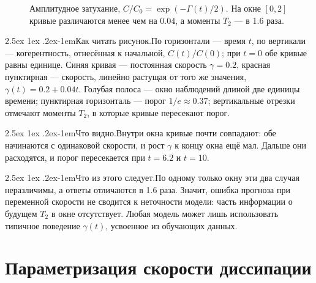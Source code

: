 \documentclass[12pt,a4paper]{report}
\makeatletter
\renewcommand\paragraph{\@startsection{paragraph}{4}{\z@}%
  {2.5ex \@plus1ex \@minus.2ex}{-1em}{\normalfont\normalsize\bfseries}}
\numberwithin{equation}{chapter}
\newcommand{\figread}{\paragraph{Как читать рисунок.}}
\newcommand{\figsee}{\paragraph{Что видно.}}
\newcommand{\figgen}{\paragraph{Что из этого следует.}}
\makeatother
\begin{document}
\begin{figure}[h]
\centering
{}
\caption{Амплитудное затухание, $C/C_0=\exp(-\Gamma(t)/2)$. На окне $[0,2]$
кривые различаются менее чем на $0.04$, а моменты $T_2$ --- в 1.6 раза.}
\label{fig:extrap}
\end{figure}

\figread По горизонтали --- время $t$, по вертикали --- когерентность,
отнесённая к начальной, $C(t)/C(0)$; при $t=0$ обе кривые равны единице.
Синяя кривая --- постоянная скорость $\gamma=0.2$, красная пунктирная ---
скорость, линейно растущая от того же значения, $\gamma(t)=0.2+0.04t$.
Голубая полоса --- окно наблюдений длиной две единицы времени; пунктирная
горизонталь --- порог $1/e\approx0.37$; вертикальные отрезки отмечают
моменты $T_2$, в которые кривые пересекают порог.

\figsee Внутри окна кривые почти совпадают: обе начинаются с одинаковой
скорости, и рост $\gamma$ к концу окна ещё мал. Дальше они расходятся, и
порог пересекается при $t=6.2$ и $t=10$.

\figgen По одному только окну эти два случая неразличимы, а ответы
отличаются в 1.6 раза. Значит, ошибка прогноза при переменной скорости не
сводится к неточности модели: часть информации о будущем $T_2$ в окне
отсутствует. Любая модель может лишь использовать типичное поведение
$\gamma(t)$, усвоенное из обучающих данных.


\section{Параметризация скорости диссипации}
\end{document}
